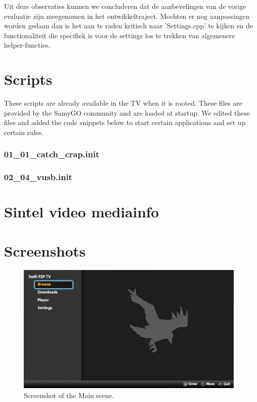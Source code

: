 Uit deze observaties kunnen we concluderen dat de aanbevelingen van de vorige evaluatie zijn meegenomen in het ontwikkeltraject. Mochten er nog aanpassingen worden gedaan dan is het aan te raden kritisch naar 'Settings.cpp' te kijken en de functionaliteit die specifiek is voor de settings los te trekken van algemenere helper-functies.

\chapter{Scripts}
These scripts are already available in the TV when it is rooted. These files are provided by the SamyGO community and are loaded at startup. We edited these files and added the code snippets below to start certain applications and set up certain rules.

\subsection{01\_01\_catch\_crap.init}
\scalebox{0.6}{

}

\subsection{02\_04\_vusb.init}
\label{sec:vusb_init}
\scalebox{0.6}{

}

\chapter{Sintel video mediainfo}
\label{sec:sintel}
\scalebox{0.5}{

}

\chapter{Screenshots}
\label{sec:screenshots}

\begin{center}
\begin{figure}[h!]
	\centering
	\mbox{\includegraphics[width=1.2\textwidth]{Images/MainScene.jpg}}
	\caption{Screenshot of the Main scene.}
\end{figure}
\end{center}

